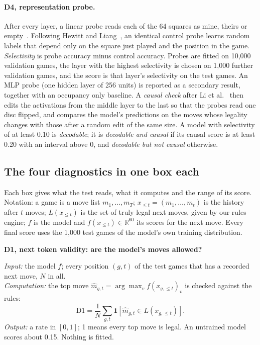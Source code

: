 \documentclass[11pt]{scrartcl}
\newenvironment{defbox}[1]{%
    \par\medskip\noindent
    \begin{lrbox}{\defboxcontent}%
    \begin{minipage}{\dimexpr\linewidth-2\fboxsep-2\fboxrule\relax}%
    \textbf{#1}\par\smallskip\small
}{%
    \end{minipage}%
    \end{lrbox}%
    \fbox{\usebox{\defboxcontent}}\par\medskip
}
\begin{document}
\paragraph{D4, representation probe.} After every layer, a linear probe reads each of the 64 squares as mine,
theirs or empty~\cite{nanda2023emergent}. Following Hewitt and Liang~\cite{hewitt2019control}, an identical
control probe learns random labels that depend only on the square just played and the position in the game.
\emph{Selectivity} is probe accuracy minus control accuracy. Probes are fitted on 10,000 validation games, the
layer with the highest selectivity is chosen on 1,000 further validation games, and the score is that layer's
selectivity on the test games. An MLP probe (one hidden layer of 256 units) is reported as a secondary result,
together with an occupancy only baseline. A \emph{causal check} after Li et al.~\cite{li2023othello} then edits
the activations from the middle layer to the last so that the probes read one disc flipped, and compares the
model's predictions on the moves whose legality changes with those after a random edit of the same size. A
model with selectivity of at least 0.10 is \emph{decodable}; it is \emph{decodable and causal} if its causal
score is at least 0.20 with an interval above 0, and \emph{decodable but not causal} otherwise.

\subsection{The four diagnostics in one box each}
\label{sec:boxes}

Each box gives what the test reads, what it computes and the range of its score. Notation: a game is a move
list $m_1,\dots,m_T$; $x_{\le t}=(m_1,\dots,m_t)$ is the history after $t$ moves; $L(x_{\le t})$ is the set of
truly legal next moves, given by our rules engine; $f$ is the model and $f(x_{\le t})\in\mathbb{R}^{60}$ its
scores for the next move. Every final score uses the 1,000 test games of the model's own training
distribution.

\begin{defbox}{D1, next token validity: are the model's moves allowed?}
\textit{Input:} the model $f$; every position $(g,t)$ of the test games that has a recorded next move, $N$ in
all.\\[2pt]
\textit{Computation:} the top move $\hat m_{g,t}=\arg\max_v f(x_{g,\le t})_v$ is checked against the rules:
\[
  \mathrm{D1}=\frac{1}{N}\sum_{g,t}\mathbf{1}\!\left[\hat m_{g,t}\in L(x_{g,\le t})\right].
\]
\textit{Output:} a rate in $[0,1]$; 1 means every top move is legal. An untrained model scores about 0.15.
Nothing is fitted.
\end{defbox}
\end{document}
